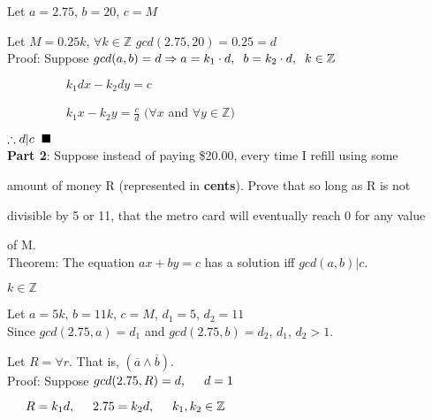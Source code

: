 \documentclass{article}
\begin{document}
Let $a = 2.75$, \hspace{0.2cm} $b = 20$, \hspace{0.2cm} $c = M$

Let $M = 0.25k$, $\forall k \in \mathbb{Z}$ \hspace{0.2cm} $gcd(2.75, 20) = 0.25 = d$ \\

Proof: Suppose $gcd(a,b) = d \Rightarrow a = k_1 \cdot d, \hspace{0.2cm} b = k_2 \cdot d, \hspace{0.2cm} k \in \mathbb{Z}$ 

$\hspace{2cm} k_1 d x - k_2 d y = c$

$\hspace{2cm} k_1 x - k_2 y = \frac{c}{d}$ \hspace{1cm} $(\forall x$ and $\forall y \in \mathbb{Z})$ 

$ \therefore d|c \hspace{0.2cm} \blacksquare$ \\

\textbf{Part 2}: Suppose instead of paying \$20.00, every time I refill using some

amount of money R (represented in \textbf{cents}). Prove that so long as R is not

divisible by 5 or 11, that the metro card will eventually reach 0 for any value 

of M. \\

Theorem: The equation $ax+by=c$ has a solution iff $gcd(a,b)|c$.

$k \in \mathbb{Z}$

Let $a=5k$, $b=11k$, $c=M$, $d_1 = 5$, $d_2 = 11$ \\

Since $gcd(2.75, a) = d_1$ and $gcd(2.75, b) = d_2$, \hspace{0.2cm} $d_1$, $d_2 > 1$.

Let $R = \forall r$. That is, $(\overline{a} \land \overline{b})$. \\

Proof: Suppose $gcd(2.75, R) = d, \hspace{0.5cm} d=1$

$\hspace{0.5cm} R = k_1 d, \hspace{0.5cm} 2.75 = k_2 d, \hspace{0.5cm} k_1, k_2 \in \mathbb{Z}$
\end{document}
